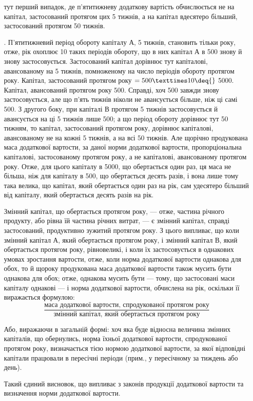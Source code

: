 \parcont{}  %
тут перший випадок, де п’ятитижневу додаткову вартість обчислюється
не на капітал, застосований протягом цих 5 тижнів, а на капітал вдесятеро
більший, застосований протягом 50 тижнів.

. П’ятитижневий період обороту капіталу $А$, 5 тижнів,
становить тільки  року, отже, рік охоплює 10 таких періодів обороту,
що в них капітал $А$ в 500 знову й знову застосовується.
Застосований капітал дорівнює тут капіталові, авансованому на 5 тижнів,
помноженому на число періодів обороту протягом року. Капітал, застосований
протягом року $= 500 × 10 \deq{}$ 5000. Капітал, авансований
протягом року \deq{}  \deq{} 500. Справді, хоч 500 завжди
знову застосовується, але що п’ять тижнів ніколи не авансується більше,
ніж ці самі 500. З другого боку, при капіталі $В$ протягом 5 тижнів
застосовується й авансується на ці 5 тижнів лише 500; а що
період обороту дорівнює тут 50 тижням, то капітал, застосований протягом
року, дорівнює капіталові, авансованому не на кожні 5 тижнів, а на
всі 50 тижнів. Але щорічно продукована маса додаткової вартости, за
даної норми додаткової вартости, пропорціональна капіталові, застосованому
протягом року, а не капіталові, авансованому протягом року. Отже, для
цього капіталу в 5000, що обертається один раз, ця маса не
більша, ніж для капіталу в 500, що обертається десять разів, і
вона лише тому така велика, що капітал, який обертається один раз на
рік, сам удесятеро більший від капіталу, який обертається десять разів
на рік.

Змінний капітал, що обертається протягом року, — отже, частина річного
продукту, або рівна їй частина річних витрат, — є змінний капітал,
справді застосований, продуктивно зужитий протягом року. З цього випливає,
що коли змінний капітал $А$, який обертається протягом року, і
змінний капітал $В$, який обертається протягом року, рівновеликі, і коли
їх застосовується в однакових умовах зростання вартости, отже, коли норма
додаткової вартости однакова для обох, то й щороку продукована
маса додаткової вартости також мусить бути однакова для обох; отже,
однакова мусить бути — тому, що застосовані маси капіталу однакові — і
норма додаткової вартости, обчислена на рік, оскільки її виражається
формулою:\[
\frac{\text{маса додаткової вартости, спродукованої протягом року}}{\text{змінний капітал, який обертається протягом
року}}
\]

\noindent{}Або, виражаючи в загальній формі: хоч яка буде відносна величина
змінних капіталів, що обернулись, норма їхньої додаткової вартости,
спродукованої протягом року, визначається тією нормою додаткової вартости,
за якої відповідні капітали працювали в пересічні періоди (прим.,
у пересічному за тиждень або день).

Такий єдиний висновок, що випливає з законів продукції додаткової
вартости та визначення норми додаткової вартости.
